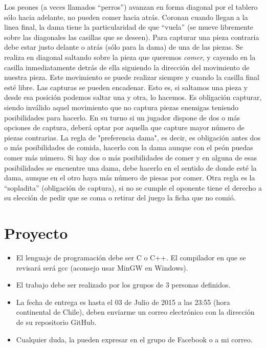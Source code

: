 \documentclass[a4paper,10pt]{article}
\begin{document}
Los peones (a veces llamados ``perros'') avanzan en forma diagonal por el tablero sólo hacia adelante, no pueden comer hacia atrás. Coronan cuando llegan a la linea final, la dama tiene la particularidad de que ``vuela'' (se mueve libremente sobre las diagonales las casillas que se deseen).
\newline
Para capturar una pieza contraria debe estar justo delante o atrás (sólo para la dama) de una de las piezas. Se realiza en diagonal saltando sobre la pieza que queremos {\it comer}, y cayendo en la casilla inmediatamente detrás de ella siguiendo la dirección del movimiento de nuestra pieza. Este movimiento se puede realizar siempre y cuando la casilla final esté libre. Las capturas se pueden encadenar. Esto es, si saltamos una pieza y desde esa posición podemos saltar una y otra, lo hacemos. Es obligación capturar, siendo inválido aquel movimiento que no captura piezas enemigas teniendo posibilidades para hacerlo. En su turno si un jugador dispone de dos o más opciones de captura, deberá optar por aquella que capture mayor número de piezas contrarias.
\newline
La regla de "preferencia dama", es decir, es obligación antes dos o más posibilidades de comida, hacerlo con la dama aunque con el peón puedas comer más número. Si hay dos o más posibilidades de comer y en alguna de esas posibilidades se encuentre una dama, debe hacerlo en el sentido de donde esté la dama, aunque en el otro haya más número de piesas por comer.
\newline
Otra regla es la ``sopladita'' (obligación de captura), si no se cumple el oponente tiene el derecho a su elección de pedir que se coma o retirar del juego la ficha que no comió.



\section{Proyecto}

\begin{itemize}
 \item El lenguaje de programación debe ser C o C++. El compilador en que se revisará será gcc (aconsejo usar MinGW en Windows).
 \item El trabajo debe ser realizado por los grupos de 3 personas definidos.
 \item La fecha de entrega es hasta el 03 de Julio de 2015 a las 23:55 (hora continental de Chile), deben enviarme un correo electrónico con la dirección de su repositorio GitHub.
 \item Cualquier duda, la pueden expresar en el grupo de Facebook o a mi correo.
\end{itemize}
\end{document}
